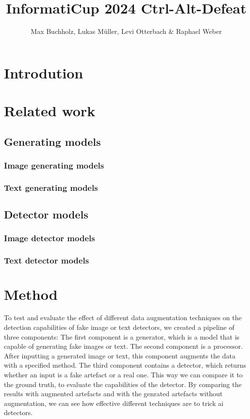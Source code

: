 \documentclass{article} %
\title{InformatiCup 2024 Ctrl-Alt-Defeat}
\author{Max Buchholz, Lukas Müller, Levi Otterbach \& Raphael Weber}
\begin{document}
\maketitle

\begin{abstract}

\end{abstract}

\section{Introdution}

\section{Related work}

\subsection{Generating models}

\subsubsection{Image generating models}

\subsubsection{Text generating models}

\subsection{Detector models}

\subsubsection{Image detector models}

\subsubsection{Text detector models}

\section{Method}
To test and evaluate the effect of different data augmentation techniques on the detection capabilities of fake image or text detectors, we created a pipeline of three components: The first component is a generator, which is a model that is capable of generating fake images or text. The second component is a processor. After inputting a generated image or text, this component augments the data with a specified method. The third component contains a detector, which returns whether an input is a fake artefact or a real one. This way we can compare it to the ground truth, to evaluate the capabilities of the detector. By comparing the results with augmented artefacts and with the genrated artefacts without augmentation, we can see how effective different techniques are to trick ai detectors.
\end{document}
